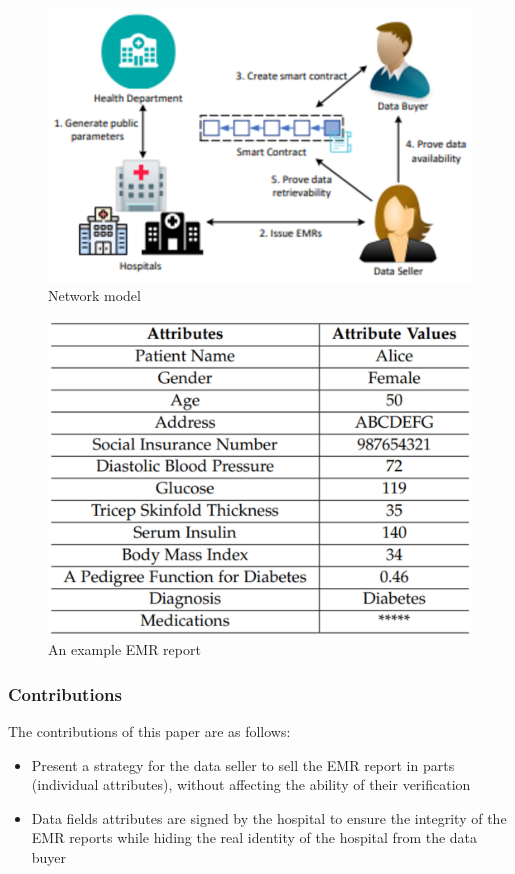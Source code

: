 \begin{figure}
\centering
  \includegraphics[width=0.96\linewidth]{imgs/23-network-model.eps}
  \caption{Network model~\cite{xue2023blockchain}}
  \label{fig:network_model}
\end{figure}

\begin{figure}
\centering
  \includegraphics[width=0.8\linewidth]{imgs/23-example-emr-report.eps}
  \caption{An example EMR report~\cite{xue2023blockchain}}
  \label{fig:example-emr-report}
\end{figure}

\subsubsection{Contributions}
The contributions of this paper are as follows:
\begin{itemize}
    \item Present a strategy for the data seller to sell the EMR report in parts (individual attributes), without affecting the ability of their verification
    \item Data fields attributes are signed by the hospital to ensure the integrity of the EMR reports while hiding the real identity of the hospital from the data buyer
\end{itemize}

